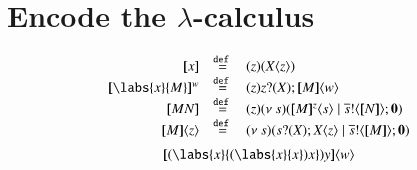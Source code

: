 \section{Encode the $\lambda$-calculus}

\[
\begin{array}{rcl}
	\map{x} &\defeq& \abs{z} (\appl{X}{z})\\
	\map{\labs{x}{M}}^w &\defeq& \abs{z}{\binp{z}{X} \appl{\map{M}}{w}}\\
	\map{M N} &\defeq& \abs{z}{\newsp{s}{ \appl{\map{M}^z}{s} \Par \bout{\dual{s}}{\map{N}} \inact }}\\
	\appl{\map{M}}{z} &\defeq& \newsp{s}{ \binp{s}{X} \appl{X}{z} \Par \bout{\dual{s}}{\map{M}} \inact}
\end{array}
\]
\[
	\appl{\map{(\labs{x}{(\labs{x}{x})x}) y }}{w}
\]

